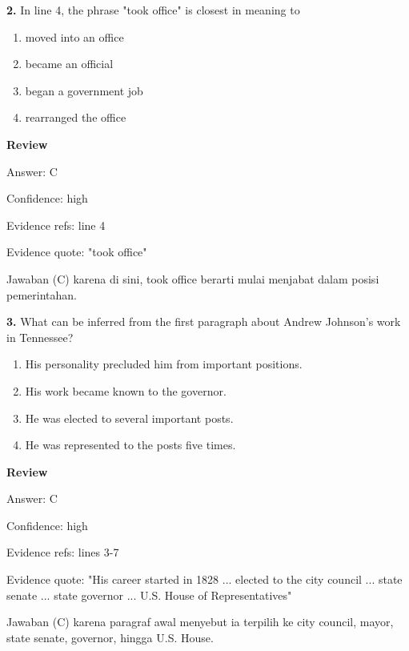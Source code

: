 \documentclass[12pt]{article}
\begin{document}
\vspace{0.25\baselineskip}
\noindent\textbf{2.} In line 4, the phrase "took office" is closest in meaning to
\begin{enumerate}[label=(\Alph*),leftmargin=*,itemsep=0.2em]
\item moved into an office
\item became an official
\item began a government job
\item rearranged the office
\end{enumerate}
\par
\begingroup
\setlength{\parskip}{0pt}
\setlength{\parindent}{0pt}
\textbf{Review}\par
Answer: C\par
Confidence: high\par
Evidence refs: line 4\par
Evidence quote: "took office"\par
Jawaban (C) karena di sini, took office berarti mulai menjabat dalam posisi pemerintahan.\par
\endgroup
\par
\vspace{0.25\baselineskip}
\noindent\textbf{3.} What can be inferred from the first paragraph about Andrew Johnson's work in Tennessee?
\begin{enumerate}[label=(\Alph*),leftmargin=*,itemsep=0.2em]
\item His personality precluded him from important positions.
\item His work became known to the governor.
\item He was elected to several important posts.
\item He was represented to the posts five times.
\end{enumerate}
\par
\begingroup
\setlength{\parskip}{0pt}
\setlength{\parindent}{0pt}
\textbf{Review}\par
Answer: C\par
Confidence: high\par
Evidence refs: lines 3-7\par
Evidence quote: "His career started in 1828 ... elected to the city council ... state senate ... state governor ... U.S. House of Representatives"\par
Jawaban (C) karena paragraf awal menyebut ia terpilih ke city council, mayor, state senate, governor, hingga U.S. House.\par
\end{document}
